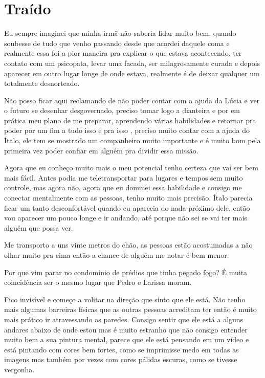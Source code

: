 
\chapter{Traído}
    




Eu sempre imaginei que minha irmã não saberia lidar muito bem, quando soubesse de tudo que venho passando desde que acordei daquele coma e realmente essa foi a pior maneira pra explicar o que estava acontecendo, ter contato com um psicopata, levar uma facada, ser milagrosamente curada e depois aparecer em outro lugar longe de onde estava, realmente é de deixar qualquer um totalmente desnorteado.

Não posso ficar aqui reclamando de não poder contar com a ajuda da Lúcia e ver o futuro se desenhar desgovernado, preciso tomar logo a dianteira e por em prática meu plano de me preparar, aprendendo várias habilidades e retornar pra poder por um fim a tudo isso e pra isso , preciso muito contar com a ajuda do Ítalo, ele tem se mostrado um companheiro muito importante e é muito bom pela primeira vez poder confiar em alguém pra dividir essa missão.

Agora que eu conheço muito mais o meu potencial tenho certeza que vai ser bem mais fácil. Antes podia me teletransportar para lugares e tempos sem muito controle, mas agora não, agora que eu dominei essa habilidade e consigo me conectar mentalmente com as pessoas, tenho muito mais precisão. Ítalo parecia ficar um tanto desconfortável quando eu aparecia do nada próximo dele, então vou aparecer um pouco longe e ir andando, até porque não sei se vai ter mais alguém que possa ver.

Me transporto a uns vinte metros do chão, as pessoas estão acostumadas a não olhar muito pra cima então a chance de alguém me notar é bem menor.

Por que vim parar no condomínio de prédios que tinha pegado fogo? É muita coincidência ser o mesmo lugar que Pedro e Larissa moram.

Fico invisível e começo a volitar na direção que sinto que ele está. Não tenho mais algumas barreiras físicas que as outras pessoas acreditam ter então é muito mais prático ir atravessando as paredes. Consigo sentir que ele está a alguns andares abaixo de onde estou mas é muito estranho que não consigo entender muito bem a sua pintura mental, parece que ele está pensando em um vídeo e está pintando com cores bem fortes, como se imprimisse medo em todas as imagens mas também por vezes com cores pálidas escuras, como se tivesse vergonha.

